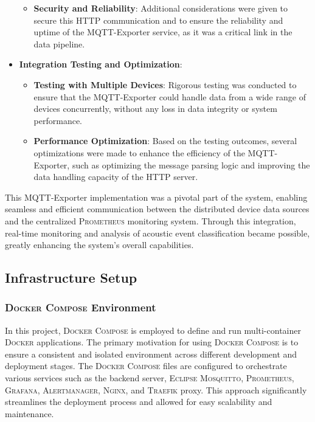 \begin{itemize}
\begin{itemize}
          \item \textbf{Security and Reliability}: Additional considerations were given to secure this HTTP communication and to ensure the reliability and uptime of the MQTT-Exporter service, as it was a critical link in the data pipeline.
        \end{itemize}
  \item \textbf{Integration Testing and Optimization}: \begin{itemize}
          \item \textbf{Testing with Multiple Devices}: Rigorous testing was conducted to ensure that the MQTT-Exporter could handle data from a wide range of devices concurrently, without any loss in data integrity or system performance.
          \item \textbf{Performance Optimization}: Based on the testing outcomes, several optimizations were made to enhance the efficiency of the MQTT-Exporter, such as optimizing the message parsing logic and improving the data handling capacity of the HTTP server.
        \end{itemize}
\end{itemize}

This MQTT-Exporter implementation was a pivotal part of the system, enabling seamless and efficient communication between the distributed device data sources and the centralized \textsc{Prometheus} monitoring system. Through this integration, real-time monitoring and analysis of acoustic event classification became possible, greatly enhancing the system's overall capabilities.

\subsection{Infrastructure Setup}
\subsubsection{\textsc{Docker Compose} Environment}
In this project, \textsc{Docker Compose} is employed to define and run multi-container \textsc{Docker} applications. The primary motivation for using \textsc{Docker Compose} is to ensure a consistent and isolated environment across different development and deployment stages. The \textsc{Docker Compose} files are configured to orchestrate various services such as the backend server, \textsc{Eclipse Mosquitto}, \textsc{Prometheus}, \textsc{Grafana}, \textsc{Alertmanager}, \textsc{Nginx}, and \textsc{Traefik} proxy. This approach significantly streamlines the deployment process and allowed for easy scalability and maintenance.

